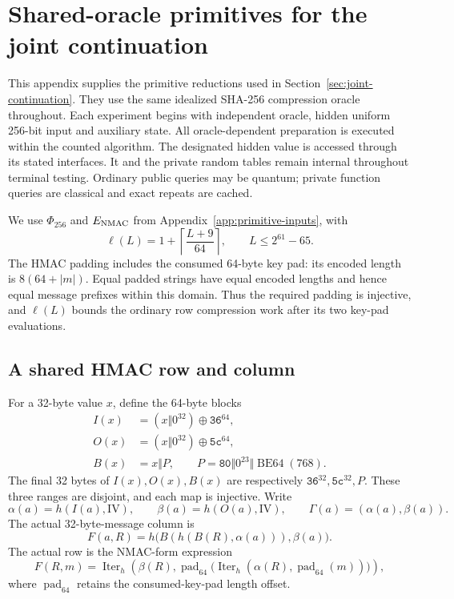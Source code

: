 \section{Shared-oracle primitives for the joint continuation}
\label{app:joint-primitives}

This appendix supplies the primitive reductions used in
Section~\ref{sec:joint-continuation}. They use the same idealized SHA-256
compression oracle throughout. Each experiment begins with independent
oracle, hidden uniform 256-bit input and auxiliary state. All
oracle-dependent preparation is executed within the counted algorithm.
The designated hidden value is accessed through its stated interfaces.
It and the private random tables remain internal throughout terminal testing.
Ordinary public queries may be quantum; private function queries are
classical and exact repeats are cached.

We use $\Phi_{256}$ and $E_{\rm NMAC}$ from
Appendix~\ref{app:primitive-inputs}, with
\[
 \ell(L)=1+\left\lceil\frac{L+9}{64}\right\rceil,
 \qquad L\le 2^{61}-65.
\]
The HMAC padding includes the consumed 64-byte key pad: its encoded
length is $8(64+|m|)$. Equal padded strings have equal encoded lengths
and hence equal message prefixes within this domain. Thus the required
padding is injective, and $\ell(L)$ bounds the ordinary row compression
work after its two key-pad evaluations.

\subsection{A shared HMAC row and column}
\label{app:joint-row-column}

For a 32-byte value $x$, define the 64-byte blocks
\[
 \begin{split}
 I(x)&=(x\Vert0^{32})\oplus\mathtt{36}^{64},\\
 O(x)&=(x\Vert0^{32})\oplus\mathtt{5c}^{64},\\
 B(x)&=x\Vert P,\qquad
 P=\mathtt{80}\Vert0^{23}\Vert\operatorname{BE64}(768).
 \end{split}
\]
The final 32 bytes of $I(x),O(x),B(x)$ are respectively
$\mathtt{36}^{32},\mathtt{5c}^{32},P$. These three ranges are disjoint,
and each map is injective. Write
\[
 \alpha(a)=h(I(a),\mathrm{IV}),\qquad
 \beta(a)=h(O(a),\mathrm{IV}),\qquad
 \Gamma(a)=(\alpha(a),\beta(a)).
\]
The actual 32-byte-message column is
\begin{equation}
 F(a,R)=h\bigl(B(h(B(R),\alpha(a))),\beta(a)\bigr).
 \label{eq:appendix-column-compression}
\end{equation}
The actual row is the NMAC-form expression
\[
 F(R,m)=\operatorname{Iter}_h\!\left(
 \beta(R),\operatorname{pad}_{64}
 \bigl(\operatorname{Iter}_h(\alpha(R),\operatorname{pad}_{64}(m))\bigr)
 \right),
\]
where $\operatorname{pad}_{64}$ retains the consumed-key-pad length offset.

